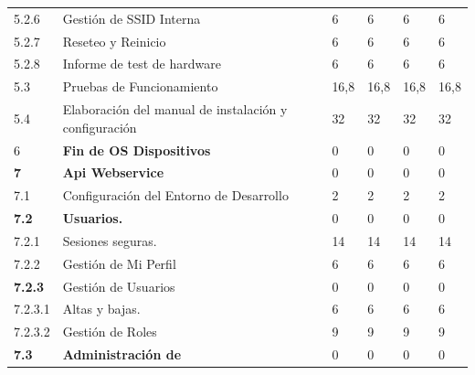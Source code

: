 \documentclass[11pt]{charter}
\begin{document}
\begin{tabularx}{\linewidth}{@{}|p{2cm}|p{11cm}|p{2.5cm}|p{2.5cm}|p{2.5cm}|p{2.5cm}|@{}}
5.2.6          & Gestión de SSID Interna                                                                       & 6    & 6    & 6    & 6    \\
5.2.7          & Reseteo y Reinicio                                                                            & 6    & 6    & 6    & 6    \\
5.2.8          & Informe de test de hardware                                                                   & 6    & 6    & 6    & 6    \\
5.3            & Pruebas de Funcionamiento                                                                     & 16,8 & 16,8 & 16,8 & 16,8 \\
5.4            & Elaboración del manual de   instalación y configuración                                       & 32   & 32   & 32   & 32   \\
6              & \textbf{Fin de OS Dispositivos}                                                               & 0    & 0    & 0    & 0    \\
\textbf{7}     & \textbf{Api Webservice}                                                                       & 0    & 0    & 0    & 0    \\
7.1            & Configuración del Entorno de   Desarrollo                                                     & 2    & 2    & 2    & 2    \\
\textbf{7.2}   & \textbf{Usuarios.}                                                                            & 0    & 0    & 0    & 0    \\
7.2.1          & Sesiones seguras.                                                                             & 14   & 14   & 14   & 14   \\
7.2.2          & Gestión de Mi Perfil                                                                          & 6    & 6    & 6    & 6    \\
\textbf{7.2.3} & Gestión de Usuarios                                                                           & 0    & 0    & 0    & 0    \\
7.2.3.1        & Altas y bajas.                                                                                & 6    & 6    & 6    & 6    \\
7.2.3.2        & Gestión de Roles                                                                              & 9    & 9    & 9    & 9    \\
\textbf{7.3}   & \textbf{Administración de}                                                                    & 0    & 0    & 0    & 0    \\

\end{tabularx}
\end{document}
